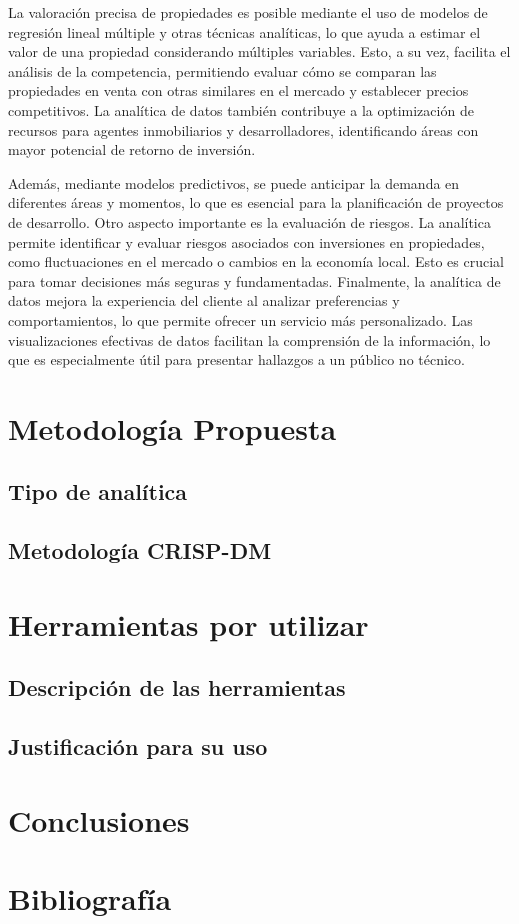\documentclass[12pt,a4paper]{article}
\begin{document}
La valoración precisa de propiedades es posible mediante el uso de modelos de regresión lineal múltiple y otras técnicas analíticas, lo que ayuda a estimar el valor de una propiedad considerando múltiples variables. Esto, a su vez, facilita el análisis de la competencia, permitiendo evaluar cómo se comparan las propiedades en venta con otras similares en el mercado y establecer precios competitivos. La analítica de datos también contribuye a la optimización de recursos para agentes inmobiliarios y desarrolladores, identificando áreas con mayor potencial de retorno de inversión.

Además, mediante modelos predictivos, se puede anticipar la demanda en diferentes áreas y momentos, lo que es esencial para la planificación de proyectos de desarrollo. Otro aspecto importante es la evaluación de riesgos. La analítica permite identificar y evaluar riesgos asociados con inversiones en propiedades, como fluctuaciones en el mercado o cambios en la economía local. Esto es crucial para tomar decisiones más seguras y fundamentadas. 
Finalmente, la analítica de datos mejora la experiencia del cliente al analizar preferencias y comportamientos, lo que permite ofrecer un servicio más personalizado. Las visualizaciones efectivas de datos facilitan la comprensión de la información, lo que es especialmente útil para presentar hallazgos a un público no técnico.

\section{Metodología Propuesta}
\subsection{Tipo de analítica}
\subsection{Metodología CRISP-DM}
\section{Herramientas por utilizar}
\subsection{Descripción de las herramientas}
\subsection{Justificación para su uso}
\section{Conclusiones}
\newpage
\section{Bibliografía}

     
\end{document}
